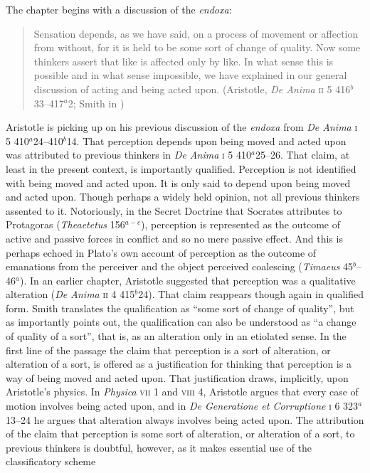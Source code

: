 The chapter begins with a discussion of the \emph{endoxa}:
\begin{quote}
	Sensation depends, as we have said, on a process of movement or affection from without, for it is held to be some sort of change of quality. Now some thinkers assert that like is affected only by like. In what sense this is possible and in what sense impossible, we have explained in our general discussion of acting and being acted upon. (Aristotle, \emph{De Anima} \textsc{ii} 5 416\( ^{b} \)33--417\( ^{a} \)2; Smith in \citealt[29]{Barnes:1984uq})
\end{quote}
Aristotle is picking up on his previous discussion of the \emph{endoxa} from \emph{De Anima} \textsc{i} 5 410\( ^{a} \)24--410\( ^{b} \)14. That perception depends upon being moved and acted upon was attributed to previous thinkers in \emph{De Anima} \textsc{i} 5 410\( ^{a} \)25--26. That claim, at least in the present context, is importantly qualified. Perception is not identified with being moved and acted upon. It is only said to depend upon being moved and acted upon. Though perhaps a widely held opinion, not all previous thinkers assented to it. Notoriously, in the Secret Doctrine that Socrates attributes to Protagoras (\emph{Theaetetus} 156\( ^{a-c} \)), perception is represented as the outcome of active and passive forces in conflict and so no mere passive effect. And this is perhaps echoed in Plato's own account of perception as the outcome of emanations from the perceiver and the object perceived coalescing (\emph{Timaeus} 45\( ^{b} \)--46\( ^{a} \)). In an earlier chapter, Aristotle suggested that perception was a qualitative alteration (\emph{De Anima} \textsc{ii} 4 415\( ^{b} \)24). That claim reappears though again in qualified form. Smith translates the qualification as ``some sort of change of quality'', but as \citet[36--37]{Burnyeat:2002an} importantly points out, the qualification can also be understood as ``a change of quality of a sort'', that is, as an alteration only in an etiolated sense. In the first line of the passage the claim that perception is a sort of alteration, or alteration of a sort, is offered as a justification for thinking that perception is a way of being moved and acted upon. That justification draws, implicitly, upon Aristotle's physics. In \emph{Physica} \textsc{vii} 1 and \textsc{viii} 4, Aristotle argues that every case of motion involves being acted upon, and in \emph{De Generatione et Corruptione} \textsc{i} 6 323\( ^{a} \)13--24 he argues that alteration always involves being acted upon. The attribution of the claim that perception is some sort of alteration, or alteration of a sort, to previous thinkers is doubtful, however, as it makes essential use of the classificatory scheme 